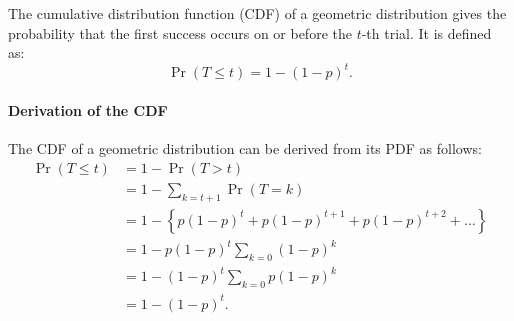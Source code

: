 \documentclass{masterthesis}
\begin{document}
The cumulative distribution function (CDF) of a geometric distribution gives the probability that the first success occurs on or before the $t$-th trial. It is defined as:
\begin{equation}
    \Pr(T \leq t) = 1 - (1 - p)^t.
\end{equation}

\paragraph*{Derivation of the CDF}
The CDF of a geometric distribution can be derived from its PDF as follows:
\begin{align*}
    \Pr(T \leq t) &= 1 - \Pr(T > t) \\
    &= 1 - \sum_{k=t+1} \Pr(T = k) \\
    &= 1 - \left\{p (1 - p)^t + p (1 - p)^{t+1} + p (1 - p)^{t+2} + \ldots\right\} \\
    &= 1 - p (1 - p)^t \sum_{k=0} (1 - p)^k \\
    &= 1 - (1 - p)^t \sum_{k=0} p (1 - p)^k \\
    &= 1 - (1 - p)^t.
\end{align*} %
\end{document}
